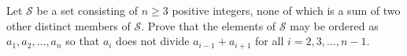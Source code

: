 Let $\mathcal{S}$ be a set consisting of $n \geq 3$ positive integers, none of which is a sum of two other distinct members of $\mathcal{S}$. Prove that the elements of $\mathcal{S}$ may be ordered as $a_1, a_2, \ldots, a_n$ so that $a_i$ does not divide $a_{i-1} + a_{i+1}$ for all $i = 2, 3, \ldots, n-1$.
